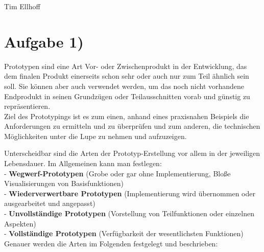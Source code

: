 \documentclass{swp1}
\begin{document}
          {Tim Ellhoff}{}{}
          
\section*{Aufgabe 1)}

Prototypen sind eine Art Vor- oder Zwischenprodukt in der Entwicklung, das dem finalen Produkt einerseits schon sehr oder auch nur zum Teil ähnlich sein soll. Sie können aber auch verwendet werden, um das noch nicht vorhandene Endprodukt in seinen Grundzügen oder Teilausschnitten vorab und günstig zu repräsentieren.\\
Ziel des Prototypings ist es zum einen, anhand eines praxisnahen Beispiels die Anforderungen zu ermitteln und zu überprüfen und zum anderen, die technischen Möglichkeiten unter die Lupe zu nehmen und aufzuzeigen. 

Unterscheidbar sind die Arten der Prototyp-Erstellung vor allem in der jeweiligen Lebensdauer. Im Allgemeinen kann man festlegen:\\

- \textbf{Wegwerf-Prototypen} (Grobe oder gar ohne Implementierung, Bloße Visualisierungen von Basisfunktionen) \\

- \textbf{Wiederverwertbare Prototypen} (Implementierung wird übernommen oder ausgearbeitet und angepasst)\\

- \textbf{Unvollständige Prototypen}  (Vorstellung von Teilfunktionen oder einzelnen Aspekten)\\

- \textbf{Vollständige Prototypen}  (Verfügbarkeit der wesentlichsten Funktionen)\\

Genauer werden die Arten im Folgenden festgelegt und beschrieben:\\
\end{document}
